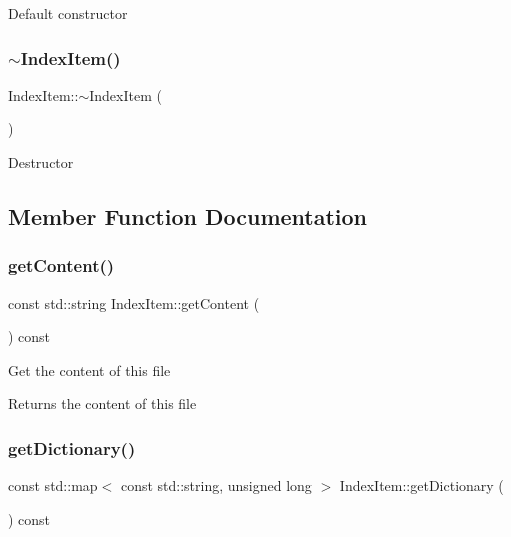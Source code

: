 Default constructor \mbox{\label{classIndexItem_a6225b6cb69e5dc134d2a7cea952cdd17}} 
\subsubsection{\texorpdfstring{$\sim$\+Index\+Item()}{~IndexItem()}}
{\footnotesize\ttfamily Index\+Item\+::$\sim$\+Index\+Item (\begin{DoxyParamCaption}{ }\end{DoxyParamCaption})\hspace{0.3cm}{\ttfamily [virtual]}}

Destructor 

\subsection{Member Function Documentation}
\mbox{\label{classIndexItem_a0cc1631297cb3859a2faecda7062805b}} 
\subsubsection{\texorpdfstring{get\+Content()}{getContent()}}
{\footnotesize\ttfamily const std\+::string Index\+Item\+::get\+Content (\begin{DoxyParamCaption}{ }\end{DoxyParamCaption}) const}

Get the content of this file \begin{DoxyReturn}{Returns}
the content of this file 
\end{DoxyReturn}
\mbox{\label{classIndexItem_a08880ba5d6f18be5b08184df13f37e9f}} 
\subsubsection{\texorpdfstring{get\+Dictionary()}{getDictionary()}}
{\footnotesize\ttfamily const std\+::map$<$ const std\+::string, unsigned long $>$ Index\+Item\+::get\+Dictionary (\begin{DoxyParamCaption}{ }\end{DoxyParamCaption}) const}

